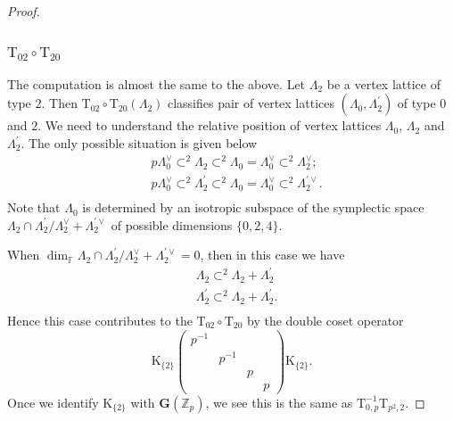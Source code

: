 \documentclass[10pt]{amsart}
\numberwithin{equation}{section}
\theoremstyle{definition}
\def\FF{\mathbb{F}}
\def\bfG{\mathbf{G}}
\def\ZZ{\mathbb{Z}}
\def\rmK{\mathrm{K}}
\def\rmT{\mathrm{T}}
\begin{document}
\begin{proof}
\subsubsection{$\rmT_{02}\circ\rmT_{20}$} The computation is almost the same to the above. Let $\Lambda_{2}$ be a vertex lattice of type $2$. Then $\rmT_{02}\circ\rmT_{20}(\Lambda_{2})$ classifies pair of vertex lattices $(\Lambda_{0}, \Lambda^{\prime}_{2})$ of type $0$ and $2$. We need to understand the relative position of vertex lattices $\Lambda_{0}$, $\Lambda_{2}$ and $\Lambda^{\prime}_{2}$. The only possible situation is given below 
\begin{equation*}
\begin{aligned}
&p\Lambda^{\vee}_{0}\subset^{2}\Lambda_{2}\subset^{2} \Lambda_{0}=\Lambda^{\vee}_{0} \subset^{2} \Lambda^{\vee}_{2};\\
&p\Lambda^{\vee}_{0}\subset^{2}\Lambda^{\prime}_{2}\subset^{2} \Lambda_{0}=\Lambda^{\vee}_{0} \subset^{2} \Lambda^{\prime\vee}_{2}.\\
\end{aligned}
\end{equation*}
Note that $\Lambda_{0}$ is determined by an isotropic subspace of the symplectic space $\Lambda_{2}\cap\Lambda^{\prime}_{2}/\Lambda^{\vee}_{2}+\Lambda^{\prime\vee}_{2}$ of possible dimensions $\{0, 2, 4\}$. 

When $\dim_{\FF} \Lambda_{2}\cap\Lambda^{\prime}_{2}/\Lambda^{\vee}_{2}+\Lambda^{\prime\vee}_{2}=0$, then in this case we have
\begin{equation*}
\begin{aligned}
&\Lambda_{2}\subset^{2} \Lambda_{2}+\Lambda^{\prime}_{2}\\ 
&\Lambda^{\prime}_{2}\subset^{2} \Lambda_{2}+\Lambda^{\prime}_{2}.\\ 
\end{aligned}
\end{equation*}
Hence this case contributes to the $\rmT_{02}\circ\rmT_{20}$ by the double coset operator
\begin{equation*}
\rmK_{\{2\}}\begin{pmatrix}p^{-1}&&&\\&p^{-1}&&\\&&p&\\&&&p\end{pmatrix}\rmK_{\{2\}}.
\end{equation*}
Once we identify $\rmK_{\{2\}}$ with $\bfG(\ZZ_{p})$, we see this is the same as $\mathrm{T}^{-1}_{0,p}\rmT_{p^{2}, 2}$.


\end{proof}
\end{document}
